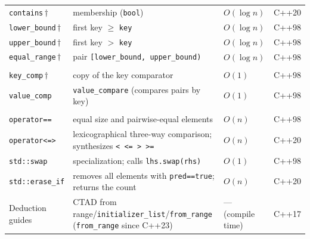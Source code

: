\begin{longtable}{@{}>{\raggedright\arraybackslash}p{3.1cm} >{\raggedright\arraybackslash}p{5.7cm} >{\raggedright\arraybackslash}p{2.7cm} >{\raggedright\arraybackslash}p{1.1cm}@{}}
  \texttt{contains}\,$\dagger$ & membership (\texttt{bool}) & $O(\log n)$ & C++20 \\
  \texttt{lower\_bound}\,$\dagger$ & first key $\ge$ \texttt{key} & $O(\log n)$ & C++98 \\
  \texttt{upper\_bound}\,$\dagger$ & first key $>$ \texttt{key} & $O(\log n)$ & C++98 \\
  \texttt{equal\_range}\,$\dagger$ & pair \texttt{[lower\_bound,\allowbreak\,upper\_bound)} & $O(\log n)$ & C++98 \\ %
  \addlinespace[3pt]
  \multicolumn{4}{@{}l}{\textbf{Observers}}\\
  \addlinespace[2pt]
  \texttt{key\_comp}\,$\dagger$ & copy of the key comparator & $O(1)$ & C++98 \\
  \texttt{value\_comp} & \texttt{value\_compare} (compares pairs by key) & $O(1)$ & C++98 \\
  \addlinespace[3pt]
  \multicolumn{4}{@{}l}{\textbf{Non-member functions}}\\
  \addlinespace[2pt]
  \texttt{operator==} & equal size and pairwise-equal elements & $O(n)$ & C++98 \\
  \texttt{operator<=>} & lexicographical three-way comparison; synthesizes \texttt{<\,<=\,>\,>=} & $O(n)$ & C++20 \\
  \texttt{std::swap} & specialization; calls \texttt{lhs.swap(rhs)} & $O(1)$ & C++98 \\
  \texttt{std::erase\_if} & removes all elements with \texttt{pred==true}; returns the count & $O(n)$ & C++20 \\
  Deduction guides & CTAD from range/\allowbreak\texttt{initializer\_list}/\allowbreak\texttt{from\_range} (\texttt{from\_range} since C++23) & --- (compile time) & C++17 \\
  \bottomrule
\end{longtable}

